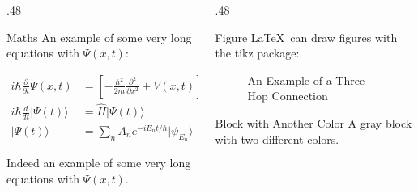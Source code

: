 \documentclass{article}
\begin{document}
\begin{frame}{}
\begin{columns}[c]
\begin{column}{.48\linewidth}
    \begin{block}{Maths}
        An example of some very long equations with $\Psi (x,t)$:
        
        \begin{align}
        i\hbar {\frac {\partial }{\partial t}}\Psi (x,t)&=\left[-{\frac {\hbar ^{2}}{2m}}{\frac {\partial ^{2}}{\partial x^{2}}}+V(x,t)\right]\Psi (x,t) \\
        i\hbar {\frac {d}{dt}}\vert \Psi (t)\rangle &={\hat {H}}\vert \Psi (t)\rangle \\ 
        |\Psi (t)\rangle &=\sum _{n}A_{n}e^{{-iE_{n}t}/\hbar }|\psi _{E_{n}}\rangle
        \end{align}
        
        Indeed an example of some very long equations with $\Psi (x,t)$.
    \end{block}
    
    \end{column}

    \begin{column}{.48\linewidth}
    
    \begin{block}{Figure}
        \LaTeX\ can draw figures with the tikz package:
        \begin{figure}[h]
        \centering
        \caption{An Example of a Three-Hop Connection}
        \label{fig:three-hop}
        \end{figure}
    \end{block}

    \begin{exampleblock}{Block with Another Color}
    A gray block with two different colors.
    \end{exampleblock}


\end{column}
\end{columns}
\end{frame}
\end{document}
